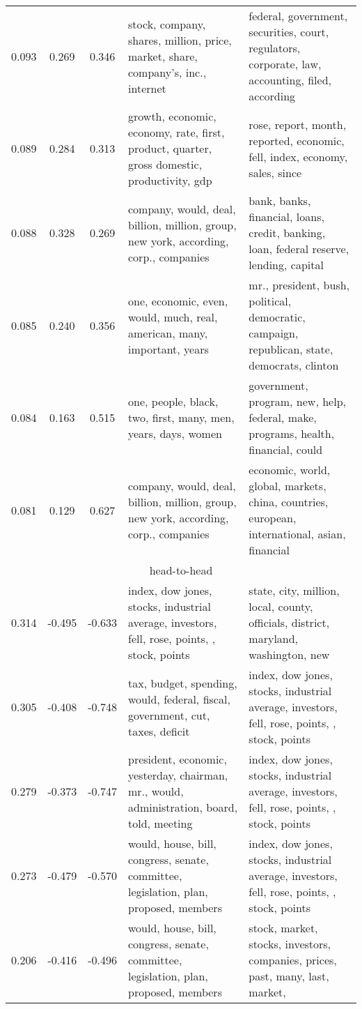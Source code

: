 \begin{tabular}{cccp{5cm}p{5cm}}
0.093 & 0.269 & 0.346 & stock, company, shares, million, price, market, share, company's, inc., internet & federal, government, securities, court, regulators, corporate, law, accounting, filed, according \\
0.089 & 0.284 & 0.313 & growth, economic, economy, rate, first, product, quarter, gross domestic, productivity, gdp & rose, report, month, reported, economic, fell, index, economy, sales, since \\
0.088 & 0.328 & 0.269 & company, would, deal, billion, million, group, new york, according, corp., companies & bank, banks, financial, loans, credit, banking, loan, federal reserve, lending, capital \\
0.085 & 0.240 & 0.356 & one, economic, even, would, much, real, american, many, important, years & mr., president, bush, political, democratic, campaign, republican, state, democrats, clinton \\
0.084 & 0.163 & 0.515 & one, people, black, two, first, many, men, years, days, women & government, program, new, help, federal, make, programs, health, financial, could \\
0.081 & 0.129 & 0.627 & company, would, deal, billion, million, group, new york, according, corp., companies & economic, world, global, markets, china, countries, european, international, asian, financial \\
\midrule
\multicolumn{5}{c}{head-to-head}\\
0.314 & -0.495 & -0.633 & index, dow jones, stocks, industrial average, investors, fell, rose, points, , stock, points & state, city, million, local, county, officials, district, maryland, washington, new \\
0.305 & -0.408 & -0.748 & tax, budget, spending, would, federal, fiscal, government, cut, taxes, deficit & index, dow jones, stocks, industrial average, investors, fell, rose, points, , stock, points \\
0.279 & -0.373 & -0.747 & president, economic, yesterday, chairman, mr., would, administration, board, told, meeting & index, dow jones, stocks, industrial average, investors, fell, rose, points, , stock, points \\
0.273 & -0.479 & -0.570 & would, house, bill, congress, senate, committee, legislation, plan, proposed, members & index, dow jones, stocks, industrial average, investors, fell, rose, points, , stock, points \\
0.206 & -0.416 & -0.496 & would, house, bill, congress, senate, committee, legislation, plan, proposed, members & stock, market, stocks, investors, companies, prices, past, many, last, market,  \\

\end{tabular}
